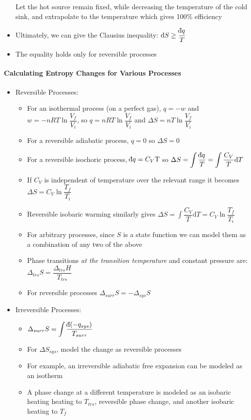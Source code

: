 \documentclass[12pt, openany, letterpaper]{memoir}
\begin{document}
\begin{itemize}
	Let the hot source remain fixed, while decreasing the temperature of the cold sink, and extrapolate to the temperature which gives 100\% efficiency
	\item Ultimately, we can give the Clausius inequality: $\mathrm{d}S\geq\dfrac{\dbar q}{T}$
	\item The equality holds only for reversible processes
\end{itemize}
\paragraph{Calculating Entropy Changes for Various Processes}
\begin{itemize}
	\item Reversible Processes:
	\begin{itemize}
		\item For an isothermal process (on a perfect gas), $q = - w$ and $w = -nRT\ln\dfrac{V_f}{V_i}$, so $q = nRT\ln\dfrac{V_f}{V_i}$ and $\Delta S = nT\ln\dfrac{V_f}{V_i}$
		\item For a reversible adiabatic process, $q=0$ so $\Delta S =0$
		\item For a reversible isochoric process, $\dbar q=C_V\mathrm{T}$ so $\Delta S = \displaystyle\int\dfrac{\dbar q}{T} = \int\dfrac{C_V}{T}\mathrm{d}T$
		\item If $C_V$ is independent of temperature over the relevant range it becomes $\Delta S = C_V\ln\dfrac{T_f}{T_i}$
		\item Reversible isobaric warming similarly gives $\Delta S = \int\dfrac{C_V}{T}\mathrm{d}T = C_V\ln\dfrac{T_f}{T_i}$
		\item For arbitrary processes, since $S$ is a state function we can model them as a combination of any two of the above
		\item Phase transitions \emph{at the transition temperature} and constant pressure are: $\Delta_{trs}S=\dfrac{\Delta_{trs}H}{T_{trs}}$
		\item For reversible processes $\Delta_{surr}S = -\Delta_{sys}S$
	\end{itemize}
	\item Irreversible Processes:
	\begin{itemize}
		\item $\Delta_{surr}S = \displaystyle\int\dfrac{\dbar (-q_{sys})}{T_{surr}}$
		\item For $\Delta S_{sys}$, model the change as reversible processes
		\item For example, an irreversible adiabatic free expansion can be modeled as an isotherm
		\item A phase change at a different temperature is modeled as an isobaric heating heating to $T_{trs}$, reversible phase change, and another isobaric heating to $T_f$
	\end{itemize}
\end{itemize}
\end{document}
